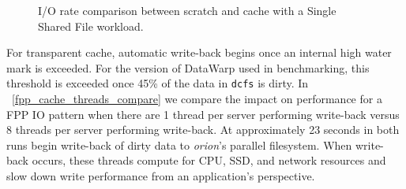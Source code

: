 \documentclass[10pt, conference, compsocconf]{IEEEtran}
\begin{document}
\begin{figure}
\centering
{}
\caption{I/O rate comparison between scratch and cache with a Single Shared File workload.\label{scratch_cache_ssf_compare}}
\end{figure}



For transparent cache, automatic write-back begins once an internal high water mark is exceeded.  For the version of DataWarp used in benchmarking, this threshold is exceeded once 45\% of the data in \texttt{dcfs} is dirty.  In \figurename~\ref{fpp_cache_threads_compare} we compare the impact on performance for a FPP IO pattern when there are 1 thread per server performing write-back versus 8 threads per server performing write-back.  At approximately 23 seconds in both runs begin write-back of dirty data to \emph{orion}'s parallel filesystem.  When write-back occurs, these threads compute for CPU, SSD, and network resources and slow down write performance from an application's perspective.
\end{document}

